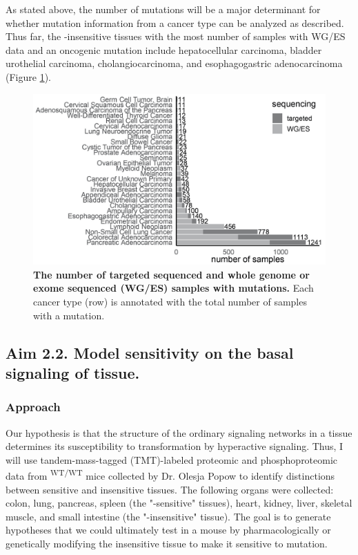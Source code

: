 As stated above, the number of \KRAS{} mutations will be a major determinant for whether mutation information from a cancer type can be analyzed as described.
Thus far, the \KRAS{}-insensitive tissues with the most number of samples with WG/ES data and an oncogenic \KRAS{} mutation include hepatocellular carcinoma, bladder urothelial carcinoma, cholangiocarcinoma, and esophagogastric adenocarcinoma (Figure \ref{fig:num-samples-kras-resistant}).

\begin{figure}[t!]
\centering
\includegraphics[width=120mm]{figures/aim2/kras-mutations-from-insensitive-tissues.jpg}
\caption{
    \textbf{The number of targeted sequenced and whole genome or exome sequenced (WG/ES) samples with \KRAS{} mutations.}
    Each cancer type (row) is annotated with the total number of samples with a \KRAS{} mutation.
}
\label{fig:num-samples-kras-resistant}
\end{figure}


\subsection*{Aim 2.2. Model \KRAS{} sensitivity on the basal signaling of tissue.}

\subsubsection*{Approach}

Our hypothesis is that the structure of the ordinary signaling networks in a tissue determines its susceptibility to transformation by hyperactive \kras{} signaling.
Thus, I will use tandem-mass-tagged (TMT)-labeled \cite{Thompson2003} proteomic and phosphoproteomic data from \moKRAS{}\textsuperscript{WT/WT} mice collected by Dr. Olesja Popow to identify distinctions between sensitive and insensitive tissues.
The following organs were collected: colon, lung, pancreas, spleen (the "\KRAS{}-sensitive" tissues), heart, kidney, liver, skeletal muscle, and small intestine (the "\KRAS{}-insensitive" tissue).
The goal is to generate hypotheses that we could ultimately test in a mouse by pharmacologically or genetically modifying the insensitive tissue to make it sensitive to \KRAS{} mutation.

